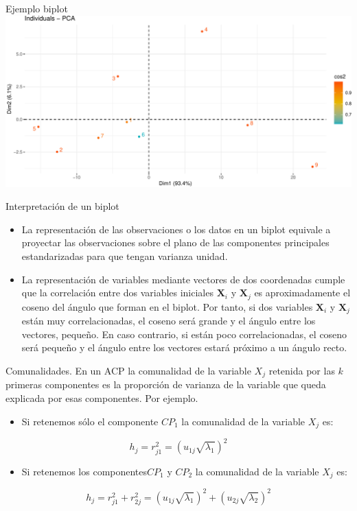 \documentclass[
  ignorenonframetext,
]{beamer}
\providecommand{\tightlist}{%
  \setlength{\itemsep}{0pt}\setlength{\parskip}{0pt}}
\begin{document}
\begin{frame}{Ejemplo biplot}
\protect\hypertarget{ejemplo-biplot-1}{}
\includegraphics{AnalisisComponentesPrincipales_fusion_files/figure-beamer/biplot3-1.pdf}
\end{frame}

\begin{frame}{Interpretación de un biplot}
\protect\hypertarget{interpretaciuxf3n-de-un-biplot}{}
\begin{itemize}
\tightlist
\item
  La representación de las observaciones o los datos en un biplot
  equivale a proyectar las observaciones sobre el plano de las
  componentes principales estandarizadas para que tengan varianza
  unidad.
\item
  La representación de variables mediante vectores de dos coordenadas
  cumple que la correlación entre dos variables iniciales
  \(\mathbf{X}_i\) y \(\mathbf{X}_j\) es aproximadamente el coseno del
  ángulo que forman en el biplot. Por tanto, si dos variables
  \(\mathbf{X}_i\) y \(\mathbf{X}_j\) están muy correlacionadas, el
  coseno será grande y el ángulo entre los vectores, pequeño. En caso
  contrario, si están poco correlacionadas, el coseno será pequeño y el
  ángulo entre los vectores estará próximo a un ángulo recto.
\end{itemize}
\end{frame}

\begin{frame}{Comunalidades.}
\protect\hypertarget{comunalidades.}{}
En un ACP la comunalidad de la variable \(X_j\) retenida por las \(k\)
primeras componentes es la proporción de varianza de la variable que
queda explicada por esas componentes. Por ejemplo.

\begin{itemize}
\tightlist
\item
  Si retenemos sólo el componente \(CP_1\) la comunalidad de la variable
  \(X_j\) es:
\end{itemize}

\[h_j=r_{j 1}^2=\left( u_{1 j}\sqrt{\lambda_1}\right)^2\]

\begin{itemize}
\tightlist
\item
  Si retenemos los componentes\(CP_1\) y \(CP_2\) la comunalidad de la
  variable \(X_j\) es:
\end{itemize}

\[h_j=r_{j 1}^2+r_{2 j}^2=\left( u_{1 j}\sqrt{\lambda_1}\right)^2+
\left( u_{2 j}\sqrt{\lambda_2}\right)^2\]
\end{frame}
\end{document}
